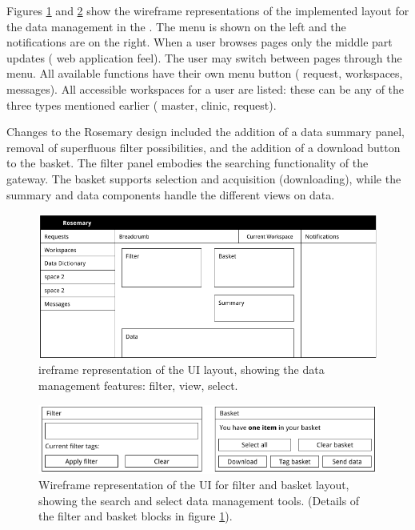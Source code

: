 Figures \ref{fig:wireframe-layout} and \ref{fig:wireframe-basket-layout} show the wireframe representations of the implemented layout for the data management in the \ivfsystem{}.
The menu is shown on the left and the notifications are on the right. When a user browses pages only the middle part updates (\ie{} web application feel).
The user may switch between pages through the menu. All available functions have their own menu button (\eg{} request, workspaces, messages).
All accessible workspaces for a user are listed: these can be any of the three types mentioned earlier (\ie{} master, clinic, request).

Changes to the Rosemary design included the addition of a data summary panel, removal of superfluous filter possibilities, and the addition of a download button to the basket.
The filter panel embodies the searching functionality of the gateway. The basket supports selection and acquisition (downloading), while the summary and data components handle the different views on data.

\begin{figure}[hb]
	\centering
	\includegraphics[width=1.0\linewidth]{images/evaluation-layout}
	\caption{
		ireframe representation of the UI layout, showing the data management features: filter, view, select.
	}
	\label{fig:wireframe-layout}
\end{figure}

\begin{figure}[hb]
	\centering
	\includegraphics[width=1.0\linewidth]{images/evaluation-basket-layout}
	\caption{
		Wireframe representation of the UI for filter and basket layout, showing the search and select data management tools.
		(Details of the filter and basket blocks in figure \ref{fig:wireframe-layout}).
	}
	\label{fig:wireframe-basket-layout}
\end{figure}